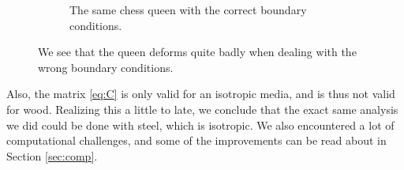 \begin{figure}[ht]
\begin{subfigure}[b]{0.45 \textwidth}
                \caption{The same chess queen with the correct boundary conditions.}
        \end{subfigure}
        \caption{We see that the queen deforms quite badly when dealing with the wrong boundary conditions. }
        \label{fig:queens}
\end{figure}


Also, the matrix \eqref{eq:C} is only valid for an isotropic media, and is thus not valid for wood. Realizing this a little to late, we conclude that the exact same analysis we did could be done with steel, which is isotropic. We also encountered a lot of computational challenges, and some of the improvements can be read about in Section \ref{sec:comp}.
